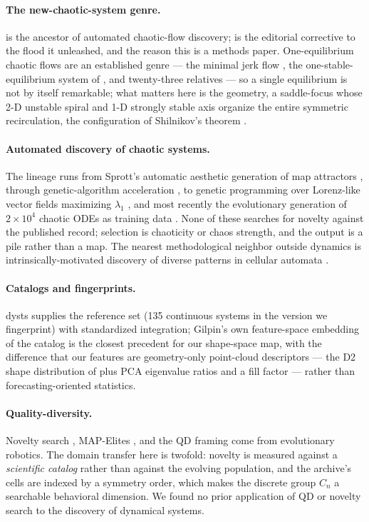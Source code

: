 \documentclass[11pt]{article}
\begin{document}
\paragraph{The new-chaotic-system genre.}
\citet{sprott1994} is the ancestor of automated chaotic-flow discovery;
\citet{sprott2011} is the editorial corrective to the flood it unleashed,
and the reason this is a methods paper. One-equilibrium chaotic flows are
an established genre --- the minimal jerk flow \citep{sprott1997}, the
one-stable-equilibrium system of \citet{wangChen2012}, and twenty-three
relatives \citep{molaie2013} --- so a single equilibrium is not by itself
remarkable; what matters here is the geometry, a saddle-focus whose 2-D
unstable spiral and 1-D strongly stable axis organize the entire symmetric
recirculation, the configuration of Shilnikov's theorem
\citep{shilnikov1965}.

\paragraph{Automated discovery of chaotic systems.}
The lineage runs from Sprott's automatic aesthetic generation of map
attractors \citep{sprott1993}, through genetic-algorithm acceleration
\citep{goertzel1995}, to genetic programming over Lorenz-like vector
fields maximizing $\lambda_1$ \citep{panDas2015}, and most recently the
evolutionary generation of $2\times10^4$ chaotic ODEs as training data
\citep{lai2025panda}. None of these searches for novelty against the
published record; selection is chaoticity or chaos strength, and the
output is a pile rather than a map. The nearest methodological neighbor
outside dynamics is intrinsically-motivated discovery of diverse patterns
in cellular automata \citep{reinke2020}.

\paragraph{Catalogs and fingerprints.}
\textsf{dysts} \citep{gilpin2021} supplies the reference set (135
continuous systems in the version we fingerprint) with standardized
integration; Gilpin's own feature-space embedding of the catalog is the
closest precedent for our shape-space map, with the difference that our
features are geometry-only point-cloud descriptors --- the D2 shape
distribution of \citet{osada2002} plus PCA eigenvalue ratios and a fill
factor --- rather than forecasting-oriented statistics.

\paragraph{Quality-diversity.}
Novelty search \citep{lehmanStanley2011}, MAP-Elites
\citep{mouretClune2015}, and the QD framing \citep{pugh2016} come from
evolutionary robotics. The domain transfer here is twofold: novelty is
measured against a \emph{scientific catalog} rather than against the
evolving population, and the archive's cells are indexed by a symmetry
order, which makes the discrete group $C_n$ a searchable behavioral
dimension. We found no prior application of QD or novelty search to the
discovery of dynamical systems.
\end{document}
